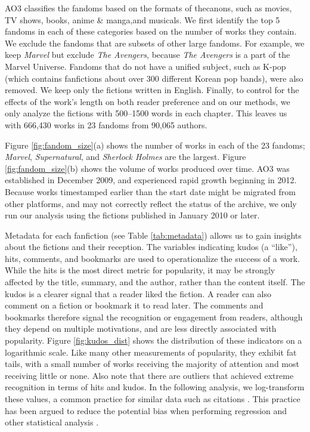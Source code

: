 \documentclass[letterpaper]{article} %
\begin{document}
AO3 classifies the fandoms based on the formats of thecanons, such as movies, TV shows, books, anime \& manga,and musicals. We first identify the top 5 fandoms in each of these categories based on the number of works they contain. We exclude the fandoms that are subsets of other large fandoms. For example, we keep \emph{Marvel} but exclude \emph{The Avengers}, because \emph{The Avengers} is a part of the Marvel Universe. Fandoms that do not have a unified subject, such as K-pop (which contains fanfictions about over 300 different Korean pop bands), were also removed. We keep only the fictions written in English. Finally, to control for the effects of the work's length on both reader preference and on our methods, we only analyze the fictions with 500--1500 words in each chapter. This leaves us with 666,430 works in 23 fandoms from 90,065 authors.

Figure \ref{fig:fandom_size}(a) shows the number of works in each of the 23 fandoms; \emph{Marvel}, \emph{Supernatural}, and \emph{Sherlock Holmes} are the largest. Figure \ref{fig:fandom_size}(b) shows the volume of works produced over time. AO3 was established in December 2009, and experienced rapid growth beginning in 2012. Because works timestamped earlier than the start date might be migrated from other platforms, and may not correctly reflect the status of the archive, we only run our analysis using the fictions published in January 2010 or later.

Metadata for each fanfiction (see Table \ref{tab:metadata}) allows us to gain insights about the fictions and their reception. The variables indicating kudos (a ``like''), hits, comments, and bookmarks are used to operationalize the success of a work. While the hits is the most direct metric for popularity, it may be strongly affected by the title, summary, and the author, rather than the content itself. The kudos is a clearer signal that a reader liked the fiction. A reader can also comment on a fiction or bookmark it to read later. The comments and bookmarks therefore signal the recognition or engagement from readers, although they depend on multiple motivations, and are less directly associated with popularity. Figure \ref{fig:kudos_dist} shows the distribution of these indicators on a logarithmic scale. Like many other measurements of popularity, they exhibit fat tails, with a small number of works receiving the majority of attention and most receiving little or none. Also note that there are outliers that achieved extreme recognition in terms of hits and kudos. In the following analysis, we log-transform these values, a common practice for similar data such as citations \cite{thelwall2014regression}. This practice has been argued to reduce the potential bias when performing regression and other statistical analysis \cite{thelwall2014regression}. 
\end{document}
